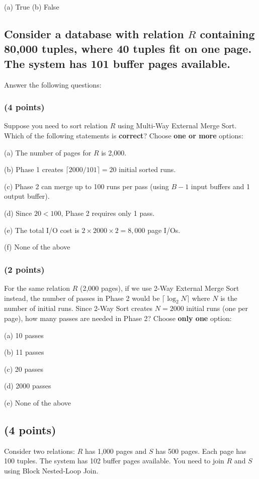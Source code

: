 \documentclass[11pt,a4paper]{article}
\begin{document}
(a) True \quad\quad (b) False

\subsection{Consider a database with relation $R$ containing 80,000 tuples, where 40 tuples fit on one page. The system has 101 buffer pages available.}

Answer the following questions:

\subsubsection{(4 points)}
Suppose you need to sort relation $R$ using Multi-Way External Merge Sort. Which of the following statements is \textbf{correct}? Choose \textbf{one or more} options:

(a) The number of pages for $R$ is 2,000.

(b) Phase 1 creates $\lceil 2000/101 \rceil = 20$ initial sorted runs.

(c) Phase 2 can merge up to 100 runs per pass (using $B-1$ input buffers and 1 output buffer).

(d) Since $20 < 100$, Phase 2 requires only 1 pass.

(e) The total I/O cost is $2 \times 2000 \times 2 = 8,000$ page I/Os.

(f) None of the above

\subsubsection{(2 points)}
For the same relation $R$ (2,000 pages), if we use 2-Way External Merge Sort instead, the number of passes in Phase 2 would be $\lceil \log_2 N \rceil$ where $N$ is the number of initial runs. Since 2-Way Sort creates $N = 2000$ initial runs (one per page), how many passes are needed in Phase 2? Choose \textbf{only one} option:

(a) 10 passes

(b) 11 passes

(c) 20 passes

(d) 2000 passes

(e) None of the above

\subsection{(4 points)}
Consider two relations: $R$ has 1,000 pages and $S$ has 500 pages. Each page has 100 tuples. The system has 102 buffer pages available. You need to join $R$ and $S$ using Block Nested-Loop Join.
\end{document}

